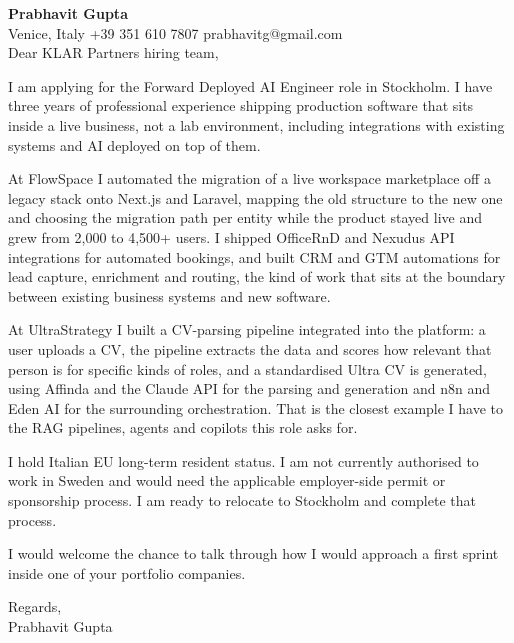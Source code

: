 \documentclass[a4paper,10.5pt]{article}
\begin{document}
\textbf{Prabhavit Gupta}\\
Venice, Italy \textbar{} +39 351 610 7807 \textbar{} prabhavitg@gmail.com\\[10pt]
Dear KLAR Partners hiring team,

I am applying for the Forward Deployed AI Engineer role in Stockholm. I have three years of professional experience shipping production software that sits inside a live business, not a lab environment, including integrations with existing systems and AI deployed on top of them.

At FlowSpace I automated the migration of a live workspace marketplace off a legacy stack onto Next.js and Laravel, mapping the old structure to the new one and choosing the migration path per entity while the product stayed live and grew from 2,000 to 4,500+ users. I shipped OfficeRnD and Nexudus API integrations for automated bookings, and built CRM and GTM automations for lead capture, enrichment and routing, the kind of work that sits at the boundary between existing business systems and new software.

At UltraStrategy I built a CV-parsing pipeline integrated into the platform: a user uploads a CV, the pipeline extracts the data and scores how relevant that person is for specific kinds of roles, and a standardised Ultra CV is generated, using Affinda and the Claude API for the parsing and generation and n8n and Eden AI for the surrounding orchestration. That is the closest example I have to the RAG pipelines, agents and copilots this role asks for.

I hold Italian EU long-term resident status. I am not currently authorised to work in Sweden and would need the applicable employer-side permit or sponsorship process. I am ready to relocate to Stockholm and complete that process.

I would welcome the chance to talk through how I would approach a first sprint inside one of your portfolio companies.

Regards,\\
Prabhavit Gupta
\end{document}
